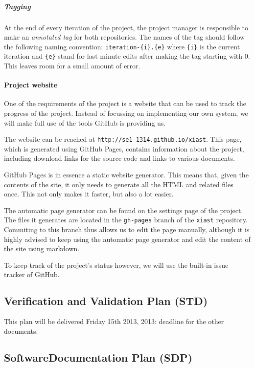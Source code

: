 \documentclass[9pt]{article}
\begin{document}
\subparagraph{Tagging}\label{tagging}

At the end of every iteration of the project, the project manager is
responsible to make an \emph{annotated tag} for both repositories. The
names of the tag should follow the following naming convention:
\texttt{iteration-\{i\}.\{e\}} where \texttt{\{i\}} is the current
iteration and \texttt{\{e\}} stand for last minute edits after making
the tag starting with 0. This leaves room for a small amount of error.

\paragraph{Project website}\label{project-website}

One of the requirements of the project is a website that can be used to
track the progress of the project. Instead of focussing on implementing
our own system, we will make full use of the tools GitHub is providing
us.

The website can be reached at \texttt{http://se1-1314.github.io/xiast}.
This page, which is generated using GitHub Pages, contains information
about the project, including download links for the source code and
links to various documents.

GitHub Pages is in essence a static website generator. This means that,
given the contents of the site, it only needs to generate all the HTML
and related files once. This not only makes it faster, but also a lot
easier.

The automatic page generator can be found on the settings page of the
project. The files it generates are located in the \texttt{gh-pages}
branch of the \texttt{xiast} repository. Commiting to this branch thus
allows us to edit the page manually, although it is highly advised to
keep using the automatic page generator and edit the content of the site
using markdown.

To keep track of the project's status however, we will use the built-in
issue tracker of GitHub.

\subsection{Verification and Validation Plan
(STD)}\label{verification-and-validation-plan-std}

This plan will be delivered Friday 15th 2013, 2013: deadline for the
other documents.

\subsection{SoftwareDocumentation Plan
(SDP)}\label{softwaredocumentation-plan-sdp}
\end{document}

